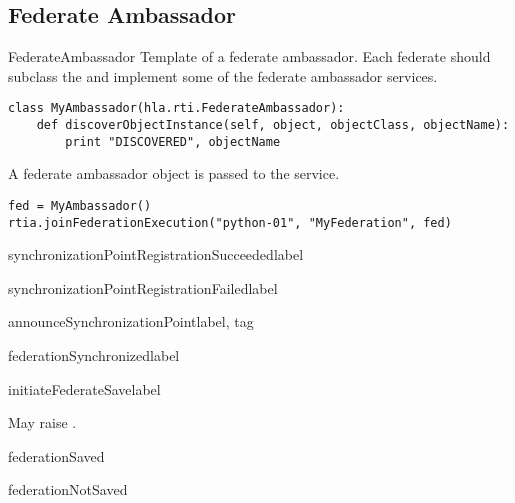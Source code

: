 \subsection{Federate Ambassador}

\begin{classdesc}{FederateAmbassador}{}
Template of a federate ambassador. Each federate should subclass the
 and implement some of the federate ambassador
services.

\begin{verbatim}
class MyAmbassador(hla.rti.FederateAmbassador):
    def discoverObjectInstance(self, object, objectClass, objectName):
        print "DISCOVERED", objectName
\end{verbatim}

A federate ambassador object is passed to the 
service.

\begin{verbatim}
fed = MyAmbassador()
rtia.joinFederationExecution("python-01", "MyFederation", fed)
\end{verbatim}

\medskip
{}

\begin{methoddesc}{synchronizationPointRegistrationSucceeded}{label}
\end{methoddesc}

\begin{methoddesc}{synchronizationPointRegistrationFailed}{label}
\end{methoddesc}

\begin{methoddesc}{announceSynchronizationPoint}{label, tag}
\end{methoddesc}

\begin{methoddesc}{federationSynchronized}{label}
\end{methoddesc}

\begin{methoddesc}{initiateFederateSave}{label}

May raise
.
\end{methoddesc}

\begin{methoddesc}{federationSaved}{}
\end{methoddesc}

\begin{methoddesc}{federationNotSaved}{}
\end{methoddesc}


\end{classdesc}

